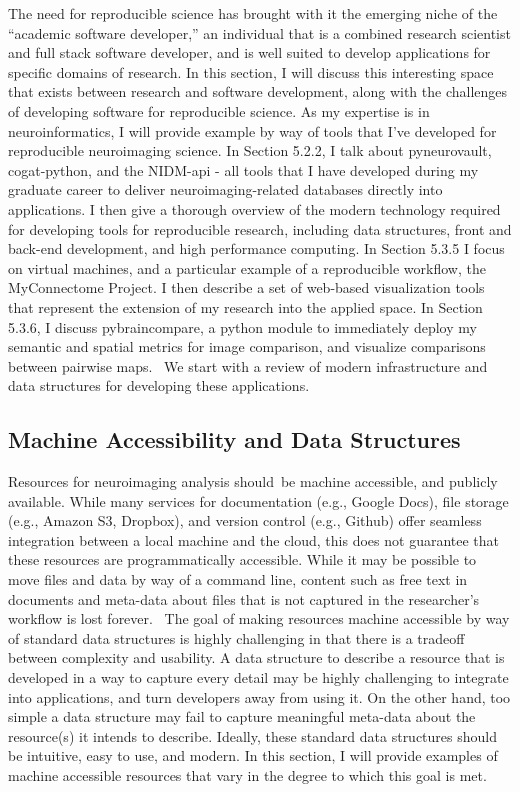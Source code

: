 \documentclass{report}
\begin{document}
The need for reproducible science has brought with it the emerging niche
of the ``academic software developer,'' an individual that is a combined
research scientist and full stack software developer, and is well suited
to develop applications for specific domains of research. In this
section, I will discuss this interesting space that exists between
research and software development, along with the challenges of
developing software for reproducible science. As my expertise is in
neuroinformatics, I will provide example by way of tools that I've
developed for reproducible neuroimaging science. In Section 5.2.2, I
talk about pyneurovault, cogat-python, and the NIDM-api - all tools that
I have developed during my graduate career to deliver
neuroimaging-related databases directly into applications. I then give a
thorough overview of the modern technology required for developing tools
for reproducible research, including data structures, front and back-end
development, and high performance computing. In Section 5.3.5 I focus on
virtual machines, and a particular example of a reproducible workflow,
the MyConnectome Project. I then describe a set of web-based visualization tools that
represent the extension of my research into the applied space. In
Section 5.3.6, I discuss pybraincompare, a python module to immediately
deploy my semantic and spatial metrics for image comparison, and
visualize comparisons between pairwise maps. ~We start with a review of
modern infrastructure and data structures for developing these
applications.

\subsection{Machine Accessibility and Data Structures}

Resources for neuroimaging analysis should~be machine accessible, and
publicly available. While many services for documentation (e.g., Google
Docs), file storage (e.g., Amazon S3, Dropbox), and version control
(e.g., Github) offer seamless integration between a local machine and
the cloud, this does not guarantee that these resources are
programmatically accessible. While it may be possible to move files and
data by way of a command line, content such as free text in documents
and meta-data about files that is not captured in the researcher's
workflow is lost forever. ~The goal of making resources machine
accessible by way of standard data structures is highly challenging in
that there is a tradeoff between complexity and usability. A data
structure to describe a resource that is developed in a way to capture
every detail may be highly challenging to integrate into applications,
and turn developers away from using it. On the other hand, too simple a
data structure may fail to capture meaningful meta-data about the
resource(s) it intends to describe. Ideally, these standard data
structures should be intuitive, easy to use, and modern. In this
section, I will provide examples of machine accessible resources that
vary in the degree to which this goal is met.
\end{document}
